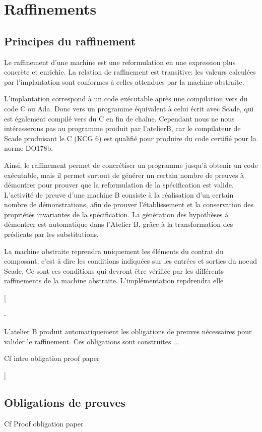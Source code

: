 
\section{Raffinements}

\subsection{Principes du raffinement}

Le raffinement d'une machine est une reformulation en une
expression plus concrète et enrichie. La relation de raffinement est transitive:
les valeurs calculées par l'implantation sont conformes à celles attendues par
la machine abstraite. 

L'implantation correspond à un code exécutable après une compilation vers du
code C ou Ada. Donc vers un programme équivalent à celui écrit avec
Scade, qui est également compilé vers du C en fin de chaîne. Cependant
nous ne nous intéresserons pas au programme produit par l'atelierB,
car le compilateur de Scade produisant le C (KCG 6) est qualifié pour produire
du code certifié pour la norme DO178b.

Ainsi, le raffinement permet de concrétiser un programme jusqu'à obtenir un code
exécutable, mais il permet surtout de générer un certain nombre de preuves à
démontrer pour prouver que la reformulation de la spécification est valide.
L'activité de preuve d'une machine B consiste à la
réalisation d'un certain nombre de démonstrations, afin de prouver
l'établissement et la conservation des propriétés invariantes de la
spécification.
La génération des hypothèses à démontrer est automatique dans l'Atelier B, grâce à la
transformation des prédicats par les substitutions. 

La machine abstraite reprendra uniquement les éléments du contrat du composant,
c'est à dire les conditions indiquées sur les entrées et sorties du noeud
Scade. Ce sont ces conditions qui devront être vérifiée par les différents
raffinements de la machine abstraite. L'implémentation repdrendra elle 


[

-

L'atelier B produit automatiquement les obligations de preuves
nécessaires pour valider le raffinement. Ces obligations sont
construites ...

Cf intro obligation proof paper

]


\subsection{Obligations de preuves}
Cf Proof obligation paper

